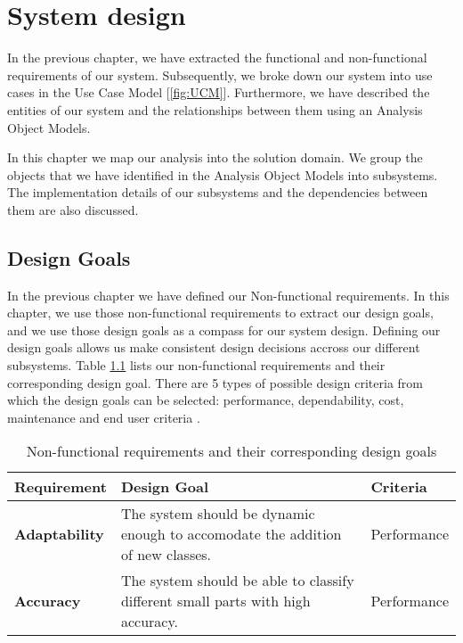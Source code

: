 \chapter{System design}\label{ch:system_design}

In the previous chapter, we have extracted the functional and non-functional requirements of our system. Subsequently, we broke down our system into use cases in the Use Case Model [\ref{fig:UCM}]. Furthermore, we have described the entities of our system and the relationships between them using an Analysis Object Models.

In this chapter we map our analysis into the solution domain. We group the objects that we have identified in the Analysis Object Models into subsystems. The implementation details of our subsystems and the dependencies between them are also discussed.

\section{Design Goals}

In the previous chapter we have defined our Non-functional requirements. In this chapter, we use those non-functional requirements to extract our design goals, and we use those design goals as a compass for our system design. Defining our design goals allows us make consistent design decisions accross our different subsystems. Table \ref{tab:DG} lists our non-functional requirements and their corresponding design goal. There are 5 types of possible design criteria from which the design goals can be selected: performance, dependability, cost, maintenance and end user criteria \cite{bruegge2004object}.

\begin{table}
  \centering
  \begin{tabular}{ | l | p{5cm} | l | }
    \hline
    \textbf{Requirement} & \textbf{Design Goal} & \textbf{Criteria} \\ \hline
    \textbf{Adaptability} & The system should be dynamic enough to accomodate the addition of new classes. & Performance \\ \hline
    \textbf{Accuracy} & The system should be able to classify different small parts with high accuracy. & Performance \\ \hline
  \end{tabular}
  \caption{Non-functional requirements and their corresponding design goals}
  \label{tab:DG}
\end{table}

